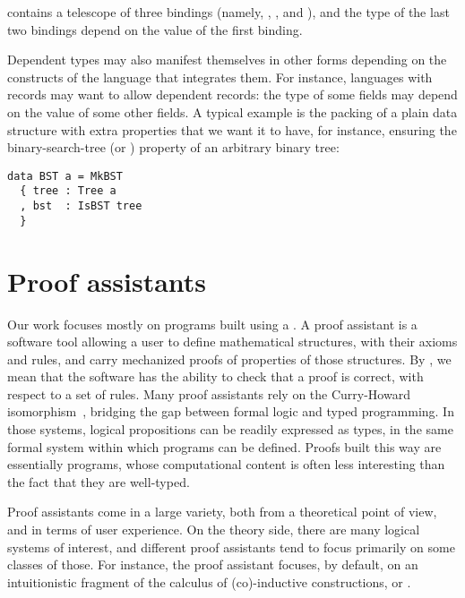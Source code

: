 
contains a telescope of three bindings (namely, , ,
and ), and the type of the last two bindings depend on the value of
the first binding.

Dependent types may also manifest themselves in other forms depending on the
constructs of the language that integrates them.  For instance, languages with
records may want to allow dependent records: the type of some fields may depend
on the value of some other fields.  A typical example is the packing of a plain
data structure with extra properties that we want it to have, for instance,
ensuring the binary-search-tree (or ) property of an arbitrary
binary tree:

\begin{verbatim}
data BST a = MkBST
  { tree : Tree a
  , bst  : IsBST tree
  }
\end{verbatim}

\section{Proof assistants}

Our work focuses mostly on programs built using a .  A
proof assistant is a software tool allowing a user to define mathematical
structures, with their axioms and rules, and carry mechanized proofs of
properties of those structures.  By , we mean that the
software has the ability to check that a proof is correct, with respect to a set
of rules.  Many proof assistants rely on the Curry-Howard
isomorphism~\cite{howard1980formulae}, bridging the gap between formal logic and
typed programming.  In those systems, logical propositions can be readily
expressed as types, in the same formal system within which programs can be
defined.  Proofs built this way are essentially programs, whose computational
content is often less interesting than the fact that they are well-typed.

Proof assistants come in a large variety, both from a theoretical point of view,
and in terms of user experience.  On the theory side, there are many logical
systems of interest, and different proof assistants tend to focus primarily on
some classes of those.  For instance, the \Coq{} proof assistant focuses, by
default, on an intuitionistic fragment of the calculus of (co)-inductive
constructions, or .

